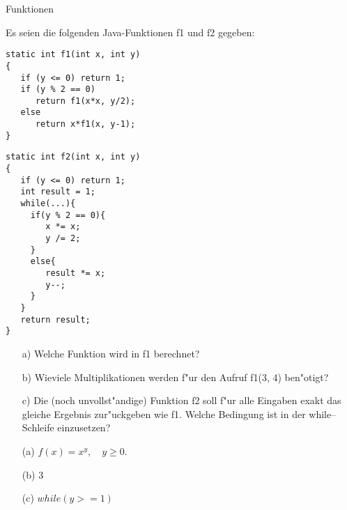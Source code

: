 \begin{exercise}{Funktionen}
\begin{body}
Es seien die folgenden Java-Funktionen f1 und f2 gegeben:
\begin{verbatim}
static int f1(int x, int y)
{
   if (y <= 0) return 1;
   if (y % 2 == 0)
      return f1(x*x, y/2);
   else
      return x*f1(x, y-1);
}
\end{verbatim}
\begin{verbatim}
static int f2(int x, int y)
{
   if (y <= 0) return 1;
   int result = 1;
   while(...){
     if(y % 2 == 0){
        x *= x;
        y /= 2;
     }
     else{
        result *= x;
        y--;
     }
   }  
   return result;
}
\end{verbatim}
\begin{itemize}
	\item[a)] Welche Funktion wird in f1 berechnet?
	\item[b)] Wieviele Multiplikationen werden f"ur den Aufruf f1(3, 4) ben"otigt?
	\item[c)] Die (noch unvollst"andige) Funktion f2 soll f"ur alle Eingaben exakt das gleiche Ergebnis 
	          zur"uckgeben wie f1. Welche Bedingung ist in der while--Schleife einzusetzen?
\end{itemize}
\end{body}

\begin{solution}
\begin{itemize}
	  \item[(a)] $f(x)=x^{y}, \quad y\geq0$.
	  \item[(b)] 3
	  \item[(c)] $while(y>=1)$
  \end{itemize}
\end{solution}

\end{exercise}